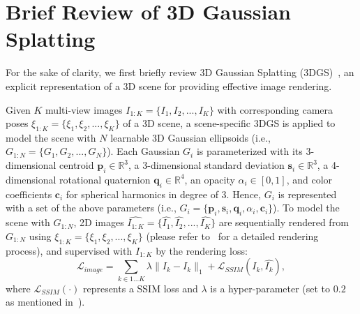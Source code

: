 
\section{Brief Review of 3D Gaussian Splatting}
\label{sec:prelim}
For the sake of clarity, we first briefly review 3D Gaussian Splatting (3DGS)~\cite{kerbl202333dgs}, an explicit representation of a 3D scene for providing effective image rendering. 


Given $K$ multi-view images $I_{1:K} = \{I_1, I_2, ..., I_K\}$ with corresponding camera poses $\xi_{1:K} = \{\xi_1, \xi_2, ..., \xi_K\}$ of a 3D scene, a scene-specific 3DGS is applied to model the scene with $N$ learnable 3D Gaussian ellipsoids (i.e., $G_{1:N} = \{G_1, G_2, ..., G_N \}$). Each Gaussian $G_i$ is parameterized with its 3-dimensional centroid $\mathbf{p}_i \in \mathbb{R}^{3}$, a 3-dimensional standard deviation $\mathbf{s}_i \in \mathbb{R}^{3}$, a 4-dimensional rotational quaternion $\mathbf{q}_i \in \mathbb{R}^{4}$, an opacity ${\alpha}_i \in [0,1]$, and color coefficients $\mathbf{c}_i$ for spherical harmonics in degree of 3. Hence, $G_i$ is represented with a set of the above parameters (i.e., $G_i = \{\mathbf{p}_i, \mathbf{s}_i, \mathbf{q}_i, {\alpha}_i, \mathbf{c}_i\}$). To model the scene with $G_{1:N}$, 2D images $\hat{I_{1:K}} = \{\hat{I_1}, \hat{I_2}, ..., \hat{I_K}\}$ are sequentially rendered from $G_{1:N}$ using $\xi_{1:K} = \{\xi_1, \xi_2, ..., \xi_K\}$ (please refer to~\cite{kerbl202333dgs} for a detailed rendering process), and supervised with $I_{1:K}$ by the rendering loss:
\begin{equation} \label{Limage}
    \mathcal{L}_{image} = \sum_{k\in {1...K}}\lambda\| I_k - {\hat{I_k}}\|_1 + \mathcal{L}_{SSIM}(I_k, \hat{I_k}),
\end{equation}
where $\mathcal{L}_{SSIM}(\cdot)$ represents a SSIM loss and $\lambda$ is a hyper-parameter (set to $0.2$ as mentioned in~\cite{kerbl202333dgs}).



